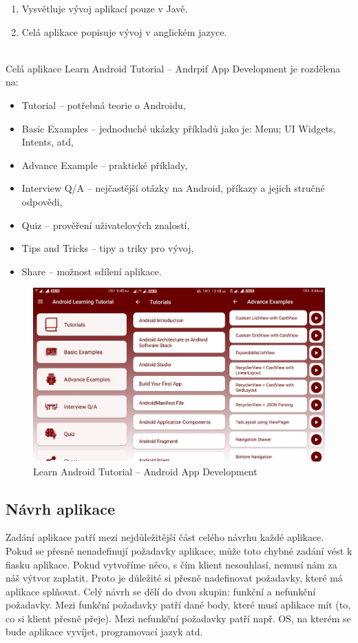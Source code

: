 \documentclass{vskpou} %
\begin{document}
\begin{enumerate}
\item {Vysvětluje vývoj aplikací pouze v Javě.}

\item {Celá aplikace popisuje vývoj v anglickém jazyce.} 

\end{enumerate}
\\
Celá aplikace Learn Android Tutorial – Andrpif App Development je rozdělena na:
\\
\begin{itemize}
    \item {Tutorial} -- potřebná teorie o Androidu,
    \item {Basic Examples} -- jednoduché ukázky příkladů jako je: Menu; UI Widgets, Intents, atd,
    \item {Advance Example} -- praktické příklady,
    \item {Interview Q/A} -- nejčastější otázky na Android, příkazy a jejich stručné odpovědi,
    \item {Quiz} -- prověření uživatelových znalostí,
    \item {Tips and Tricks} -- tipy a triky pro vývoj,
    \item {Share} -- možnost sdílení aplikace.
\end{itemize}

 \begin{figure}[h!]
\centering
\includegraphics[scale=0.4]{images/15.jpg}
\caption{Learn Android Tutorial – Android App Development}
\label{15}
\end{figure}

\subsection{Návrh aplikace}
Zadání aplikace patří mezi nejdůležitější část celého návrhu každé aplikace. Pokud se přesně nenadefinují požadavky aplikace, může toto chybné zadání vést k fiasku aplikace. Pokud vytvoříme něco, s čím klient nesouhlasí, nemusí nám za náš výtvor zaplatit. Proto je důležité si přesně nadefinovat požadavky, které má aplikace splňovat. Celý návrh se dělí do dvou skupin: funkční a nefunkční požadavky. Mezi funkční požadavky patří dané body, které musí aplikace mít (to, co si klient přesně přeje). Mezi nefunkční požadavky patří např. OS, na kterém se bude aplikace vyvíjet, programovací jazyk atd.
\end{document}
